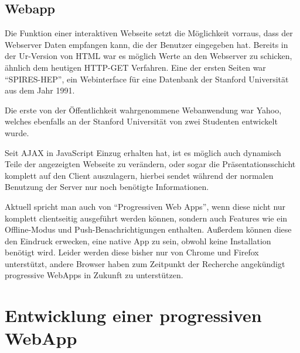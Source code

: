 \documentclass[a4paper,12pt,ngerman,listof=numbered]{scrartcl}      %
\let\oldcite\cite
\renewcommand{\cite}[1]{\textsuperscript{\oldcite{#1}}}
\begin{document}
	\subsection{Webapp}
	Die Funktion einer interaktiven Webseite setzt die Möglichkeit vorraus, dass der Webserver Daten empfangen kann, die der Benutzer eingegeben hat. Bereits in der Ur-Version von HTML war es möglich Werte an den Webserver zu schicken, ähnlich dem heutigen HTTP-GET Verfahren. Eine der ersten Seiten war ``SPIRES-HEP'', ein Webinterface für eine Datenbank der Stanford Universität aus dem Jahr 1991.\par
	Die erste von der Öffentlichkeit wahrgenommene Webanwendung war Yahoo, welches ebenfalls an der Stanford Universität von zwei Studenten entwickelt wurde.\par
	Seit AJAX in JavaScript Einzug erhalten hat, ist es möglich auch dynamisch Teile der angezeigten Webseite zu verändern, oder sogar die Präsentationsschicht komplett auf den Client auszulagern, hierbei sendet während der normalen Benutzung der Server nur noch benötigte Informationen.\cite{webappWiki}\par
	Aktuell spricht man auch von ``Progressiven Web Apps'', wenn diese nicht nur komplett clientseitig ausgeführt werden können, sondern auch Features wie ein Offline-Modus und Push-Be\-nach\-rich\-ti\-gungen enthalten. Außerdem können diese den Eindruck erwecken, eine native App zu sein, obwohl keine Installation benötigt wird. Leider werden diese bisher nur von Chrome und Firefox unterstützt, andere Browser haben zum Zeitpunkt der Recherche angekündigt progressive WebApps in Zukunft zu unterstützen.\cite{prwebappWiki}\par

	\section{Entwicklung einer progressiven WebApp}
\end{document}
